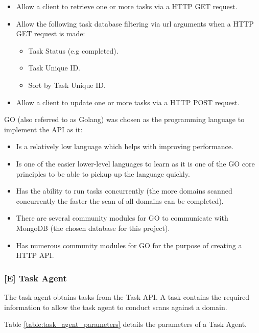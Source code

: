 \documentclass{mscreport}
\begin{document}
\begin{itemize}
	\setlength\itemsep{0.1em}
    \item Allow a client to retrieve one or more tasks via a HTTP GET request.
    \item Allow the following task database filtering via url arguments when a HTTP GET request is made:
    	\begin{itemize}
		\setlength\itemsep{0.1em}
	    \item Task Status (e.g completed).
   		\item Task Unique ID.
	    \item Sort by Task Unique ID.
	\end{itemize}
    \item Allow a client to update one or more tasks via a HTTP POST request.
\end{itemize}

\vspace{0.6cm} \noindent
GO (also referred to as Golang) was chosen as the programming language to implement the API as it:
\begin{itemize}
	\setlength\itemsep{0.1em}
    \item Is a relatively low language which helps with improving performance.
    \item Is one of the easier lower-level languages to learn as it is one of the GO core principles to be able to pickup up the language quickly.
    \item Has the ability to run tasks concurrently (the more domains scanned concurrently the faster the scan of all domains can be completed).
    \item There are several community modules for GO to communicate with MongoDB (the chosen database for this project).
    \item Has numerous community modules for GO for the purpose of creating a HTTP API.
\end{itemize}

\subsubsection{[E] Task Agent}

The task agent obtains tasks from the Task API. A task contains the required information to allow the task agent to conduct scans against a domain.

\vspace{0.6cm} \noindent
Table \ref{table:task_agent_parameters} details the parameters of a Task Agent.
\newpage
\end{document}
